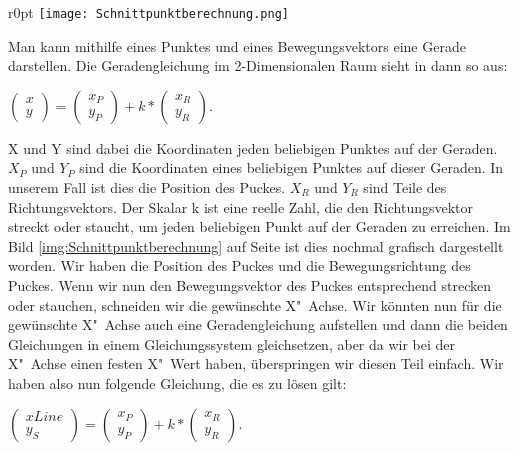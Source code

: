 \begin{wrapfigure}{r}{0pt}
	\vspace{-45pt}
	\texttt{[image: Schnittpunktberechnung.png]}
	\vspace{-15pt}
	\caption{Veranschaulichung der Schnitt"-punkt"-be"-rechnung}
	\vspace{-60pt}
	\label{img:Schnittpunktberechnung}
\end{wrapfigure}

Man kann mithilfe eines Punktes und eines Bewegungsvektors eine Gerade darstellen. Die Geradengleichung im 2-Dimensionalen Raum sieht in dann so aus: 

$\left(\begin{array}{c} x \\ y \end{array}\right) = \left(\begin{array}{c} x_P \\ y_P \end{array}\right) + k * \left(\begin{array}{c} x_R \\ y_R \end{array}\right)$. 

X und Y sind dabei die Koordinaten jeden beliebigen Punktes auf der Geraden. $X_P$ und $Y_P$ sind die Koordinaten eines beliebigen Punktes auf dieser Geraden. In unserem Fall ist dies die Position des Puckes. $X_R$ und $Y_R$ sind Teile des Richtungsvektors. Der Skalar k ist eine reelle Zahl, die den Richtungsvektor streckt oder staucht, um jeden beliebigen Punkt auf der Geraden zu erreichen. Im Bild \ref{img:Schnittpunktberechnung} auf Seite \pageref{img:Schnittpunktberechnung} ist dies nochmal grafisch dargestellt worden. Wir haben die Position des Puckes und die Bewegungsrichtung des Puckes. Wenn wir nun den Bewegungsvektor des Puckes entsprechend strecken oder stauchen, schneiden wir die gewünschte X"~Achse. Wir könnten nun für die gewünschte X"~Achse auch eine Geradengleichung aufstellen und dann die beiden Gleichungen in einem Gleichungssystem gleichsetzen, aber da wir bei der X"~Achse einen festen X"~Wert haben, überspringen wir diesen Teil einfach. Wir haben also nun folgende Gleichung, die es zu lösen gilt: 

$\left(\begin{array}{c} xLine \\ y_S \end{array}\right) = \left(\begin{array}{c} x_P \\ y_P \end{array}\right) + k * \left(\begin{array}{c} x_R \\ y_R \end{array}\right)$. 

